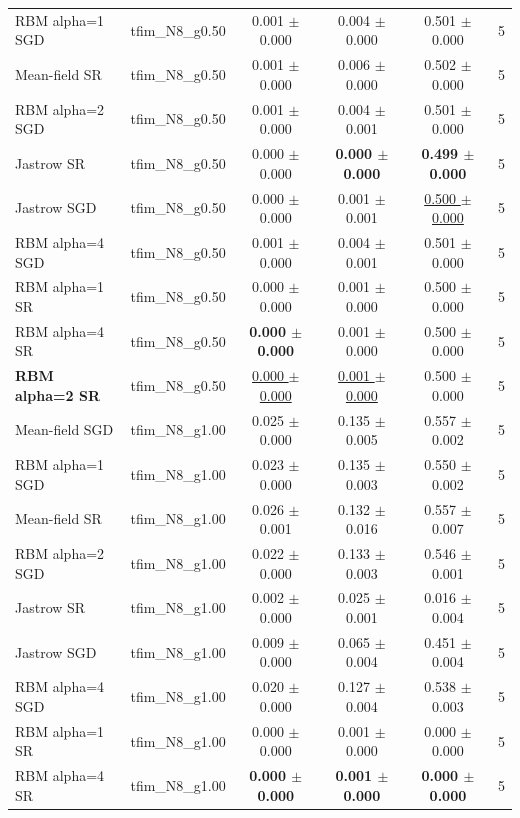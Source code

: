 \begin{tabular}{llcccc}
RBM alpha=1 SGD & tfim\_N8\_g0.50 & 0.001 $\pm$ 0.000 & 0.004 $\pm$ 0.000 & 0.501 $\pm$ 0.000 & 5 \\
Mean-field SR & tfim\_N8\_g0.50 & 0.001 $\pm$ 0.000 & 0.006 $\pm$ 0.000 & 0.502 $\pm$ 0.000 & 5 \\
RBM alpha=2 SGD & tfim\_N8\_g0.50 & 0.001 $\pm$ 0.000 & 0.004 $\pm$ 0.001 & 0.501 $\pm$ 0.000 & 5 \\
Jastrow SR & tfim\_N8\_g0.50 & 0.000 $\pm$ 0.000 & \textbf{0.000 $\pm$ 0.000} & \textbf{0.499 $\pm$ 0.000} & 5 \\
Jastrow SGD & tfim\_N8\_g0.50 & 0.000 $\pm$ 0.000 & 0.001 $\pm$ 0.001 & \underline{0.500 $\pm$ 0.000} & 5 \\
RBM alpha=4 SGD & tfim\_N8\_g0.50 & 0.001 $\pm$ 0.000 & 0.004 $\pm$ 0.001 & 0.501 $\pm$ 0.000 & 5 \\
RBM alpha=1 SR & tfim\_N8\_g0.50 & 0.000 $\pm$ 0.000 & 0.001 $\pm$ 0.000 & 0.500 $\pm$ 0.000 & 5 \\
RBM alpha=4 SR & tfim\_N8\_g0.50 & \textbf{0.000 $\pm$ 0.000} & 0.001 $\pm$ 0.000 & 0.500 $\pm$ 0.000 & 5 \\
\textbf{RBM alpha=2 SR} & tfim\_N8\_g0.50 & \underline{0.000 $\pm$ 0.000} & \underline{0.001 $\pm$ 0.000} & 0.500 $\pm$ 0.000 & 5 \\
\midrule
Mean-field SGD & tfim\_N8\_g1.00 & 0.025 $\pm$ 0.000 & 0.135 $\pm$ 0.005 & 0.557 $\pm$ 0.002 & 5 \\
RBM alpha=1 SGD & tfim\_N8\_g1.00 & 0.023 $\pm$ 0.000 & 0.135 $\pm$ 0.003 & 0.550 $\pm$ 0.002 & 5 \\
Mean-field SR & tfim\_N8\_g1.00 & 0.026 $\pm$ 0.001 & 0.132 $\pm$ 0.016 & 0.557 $\pm$ 0.007 & 5 \\
RBM alpha=2 SGD & tfim\_N8\_g1.00 & 0.022 $\pm$ 0.000 & 0.133 $\pm$ 0.003 & 0.546 $\pm$ 0.001 & 5 \\
Jastrow SR & tfim\_N8\_g1.00 & 0.002 $\pm$ 0.000 & 0.025 $\pm$ 0.001 & 0.016 $\pm$ 0.004 & 5 \\
Jastrow SGD & tfim\_N8\_g1.00 & 0.009 $\pm$ 0.000 & 0.065 $\pm$ 0.004 & 0.451 $\pm$ 0.004 & 5 \\
RBM alpha=4 SGD & tfim\_N8\_g1.00 & 0.020 $\pm$ 0.000 & 0.127 $\pm$ 0.004 & 0.538 $\pm$ 0.003 & 5 \\
RBM alpha=1 SR & tfim\_N8\_g1.00 & 0.000 $\pm$ 0.000 & 0.001 $\pm$ 0.000 & 0.000 $\pm$ 0.000 & 5 \\
RBM alpha=4 SR & tfim\_N8\_g1.00 & \textbf{0.000 $\pm$ 0.000} & \textbf{0.001 $\pm$ 0.000} & \textbf{0.000 $\pm$ 0.000} & 5 \\

\end{tabular}
